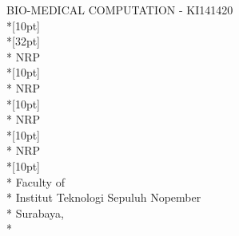 \newpage

	\sffamily
	\thispagestyle{empty}
	{ \noindent BIO-MEDICAL COMPUTATION - KI141420 }\\*[10pt] 
	{\large\textbf{\MakeUppercase{\judul}}} \\*[32pt]
	\MakeUppercase{\penulisSatu} \\*
	NRP \nrpSatu \\*[10pt]
	\MakeUppercase{\penulisDua} \\*
	NRP \nrpDua \\*[10pt]
	\MakeUppercase{\penulisTiga} \\*
	NRP \nrpTiga \\*[10pt]
	\MakeUppercase{\penulisEmpat} \\*
	NRP \nrpEmpat \\*[10pt]
	\MakeUppercase{\jurusan} \\*
	Faculty of \fakultas \\*
	Institut Teknologi Sepuluh Nopember \\*
	Surabaya, \tahun \\*
	\rmfamily
	\normalsize
	\restoregeometry
	\color{black}
	\cleardoublepage